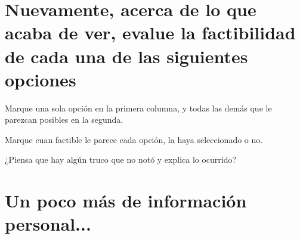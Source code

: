 \documentclass[
  spanish,
  a4paper, %
  globalid=1003, %
  print_questionnaire_id,
  pagemark,
  stamp]{sdaps}
\begin{document}
\begin{questionnaire}[noinfo]

    \newpage

    \section{Nuevamente, acerca de lo que acaba de ver, evalue la factibilidad de cada una de las siguientes opciones}
    
      \begin{multicols}{2}
      \begin{choicegroup}{Marque una sola opción en la primera columna, y todas las demás que le parezcan posibles en la segunda.}
      
      \end{choicegroup}

	\setcounter{markcheckboxcount}{7}
	\begin{markgroup}{Marque cuan factible le parece cada opción, la haya seleccionado o no.}
	\end{markgroup}

    \end{multicols}

    \begin{choicequestion}[3]{¿Piensa que hay algún truco que no notó y explica lo ocurrido?}
    \end{choicequestion}

	\section{Un poco más de información personal...}


\end{questionnaire}
\end{document}
